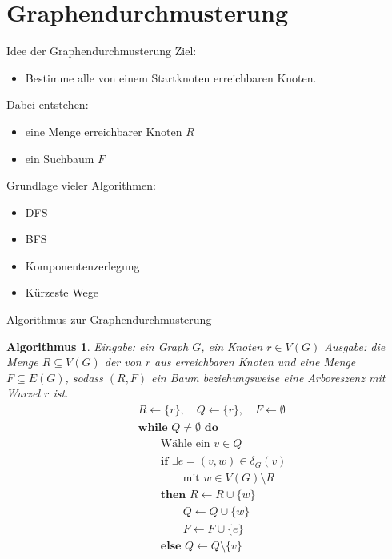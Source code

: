 \documentclass{beamer}
\newtheorem{algorithmus}{Algorithmus}
\begin{document}
\section{Graphendurchmusterung}
\begin{frame}{Idee der Graphendurchmusterung}
Ziel:
\begin{itemize}
    \item Bestimme alle von einem Startknoten erreichbaren Knoten.
\end{itemize}
\vspace{0.4cm}
Dabei entstehen:
\begin{itemize}
    \item eine Menge erreichbarer Knoten \(R\)
    \item ein Suchbaum \(F\)
\end{itemize}
\vspace{0.4cm}
Grundlage vieler Algorithmen:
\begin{itemize}
    \item DFS
    \item BFS
    \item Komponentenzerlegung
    \item Kürzeste Wege
\end{itemize}
\end{frame}
\begin{frame}{Algorithmus zur Graphendurchmusterung}
\begin{algorithmus}
Eingabe: ein Graph \(G\), ein Knoten \(r \in V(G)\)
Ausgabe: die Menge \(R \subseteq V(G)\) der von \(r\) aus erreichbaren Knoten und eine Menge \(F \subseteq E(G)\), sodass \((R,F)\) ein Baum beziehungsweise eine Arboreszenz mit Wurzel \(r\) ist.
\begin{align*}
&R \leftarrow \{r\},\quad Q \leftarrow \{r\},\quad F \leftarrow \emptyset\\
&\textbf{while } Q \neq \emptyset \textbf{ do}\\
&\qquad \text{Wähle ein } v \in Q\\
&\qquad \textbf{if } \exists e=(v,w)\in \delta_G^+(v)\\
&\qquad\qquad \text{mit } w\in V(G)\setminus R\\
&\qquad \textbf{then } R\leftarrow R\cup\{w\}\\
&\qquad\qquad Q\leftarrow Q\cup\{w\}\\
&\qquad\qquad F\leftarrow F\cup\{e\}\\
&\qquad \textbf{else } Q\leftarrow Q\setminus\{v\}
\end{align*}
\end{algorithmus}
\end{frame}
\end{document}

